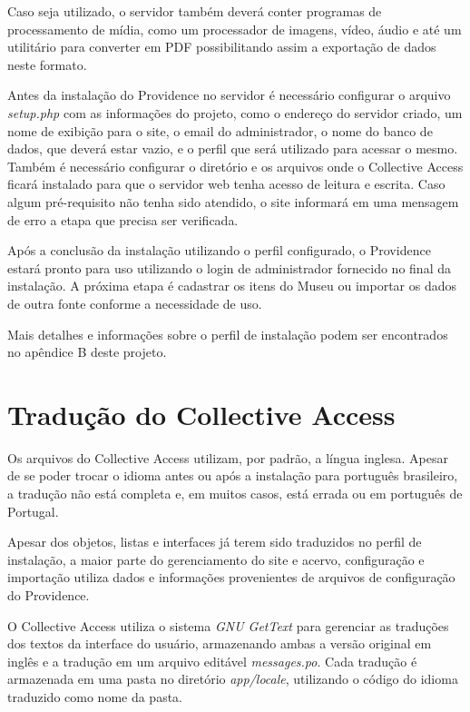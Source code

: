 \documentclass[a4paper,12pt,oneside,onecolumn,final,fleqn]{repUERJ}
\begin{document}
Caso seja utilizado, o servidor também deverá conter programas de processamento de mídia, como um processador de imagens, vídeo, áudio e até um utilitário para converter em PDF possibilitando assim a exportação de dados neste formato.

Antes da instalação do Providence no servidor é necessário configurar o arquivo \textit{setup.php} com as informações do projeto, como o endereço do servidor criado, um nome de exibição para o site, o email do administrador, o nome do banco de dados, que deverá estar vazio, e o perfil que será utilizado para acessar o mesmo. Também é necessário configurar o diretório e os arquivos onde o Collective Access ficará instalado para que o servidor web tenha acesso de leitura e escrita. Caso algum pré-requisito não tenha sido atendido, o site informará em uma mensagem de erro a etapa que precisa ser verificada.

Após a conclusão da instalação utilizando o perfil configurado, o Providence estará pronto para uso utilizando o login de administrador fornecido no final da instalação. A próxima etapa é cadastrar os itens do Museu ou importar os dados de outra fonte conforme a necessidade de uso.

Mais detalhes e informações sobre o perfil de instalação podem ser encontrados no apêndice B deste projeto.

\section{Tradução do Collective Access}

Os arquivos do Collective Access utilizam, por padrão, a língua inglesa. Apesar de se poder trocar o idioma antes ou após a instalação para português brasileiro, a tradução não está completa e, em muitos casos, está errada ou em português de Portugal.

Apesar dos objetos, listas e interfaces já terem sido traduzidos no perfil de instalação, a maior parte do gerenciamento do site e acervo, configuração e importação utiliza dados e informações provenientes de arquivos de configuração do Providence.

O Collective Access utiliza o sistema \textit{GNU GetText} para gerenciar as traduções dos textos da interface do usuário, armazenando ambas a versão original em inglês e a tradução em um arquivo editável \textit{messages.po}. Cada tradução é armazenada em uma pasta no diretório \textit{app/locale}, utilizando o código do idioma traduzido como nome da pasta.
\end{document}
